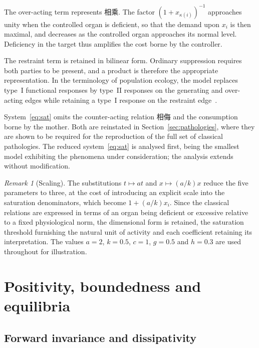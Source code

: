 \documentclass[11pt]{article}
\theoremstyle{definition}
\theoremstyle{remark}
\newtheorem{remark}[theorem]{Remark}
\begin{document}
	The over-acting term represents 相乘. The factor $(1+x_{\kappa(i)})^{-1}$
	approaches unity when the controlled organ is deficient, so that the demand upon
	$x_i$ is then maximal, and decreases as the controlled organ approaches its normal
	level. Deficiency in the target thus amplifies the cost borne by the controller.
	
	The restraint term is retained in bilinear form. Ordinary suppression requires both
	parties to be present, and a product is therefore the appropriate representation. In
	the terminology of population ecology, the model replaces type~I functional
	responses by type~II responses on the generating and over-acting edges while
	retaining a type~I response on the restraint edge~\cite{Holling1959,Murray2002}.
	
	System~\eqref{eq:sat} omits the counter-acting relation 相侮 and the
	consumption borne by the mother. Both are reinstated in
	Section~\ref{sec:pathologies}, where they are shown to be required for the
	reproduction of the full set of classical pathologies. The reduced
	system~\eqref{eq:sat} is analysed first, being the smallest model exhibiting the
	phenomena under consideration; the analysis extends without modification.
	
	\begin{remark}[Scaling]\label{rem:scaling}
		The substitutions $t\mapsto at$ and $x\mapsto (a/k)x$ reduce the five parameters to
		three, at the cost of introducing an explicit scale into the saturation
		denominators, which become $1+(a/k)x_i$. Since the classical relations are expressed
		in terms of an organ being deficient or excessive relative to a fixed physiological
		norm, the dimensional form is retained, the saturation threshold furnishing the
		natural unit of activity and each coefficient retaining its interpretation. The
		values $a=2$, $k=0.5$, $c=1$, $g=0.5$ and $h=0.3$ are used throughout for
		illustration.
	\end{remark}
	\section{Positivity, boundedness and equilibria}\label{sec:basic}
	
	\subsection{Forward invariance and dissipativity}
	
\end{document}
